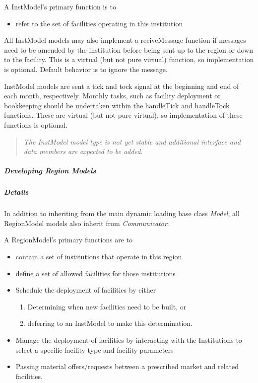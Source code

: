 \documentclass[letterpaper,10pt,english]{sphinxmanual}
\begin{document}
A InstModel's primary function is to
\begin{itemize}
\item {} 
refer to the set of facilities operating in this institution

\end{itemize}

All InstModel models may also implement a reciveMessage function if messages
need to be amended by the institution before being sent up to the region or
down to the facility. This is a virtual (but not pure virtual) function, so
implementation is optional. Default behavior is to ignore the message.

InstModel models are sent a tick and tock signal at the beginning and end of
each month, respectively. Monthly tasks, such as facility deployment or
bookkeeping should be undertaken within the handleTick and handleTock
functions. These are virtual (but not pure virtual), so implementation of these
functions is optional.
\begin{quote}

\emph{The InstModel model type is not yet stable and additional interface and
data members are expected to be added.}
\end{quote}


\subparagraph{Developing Region Models}
\label{devdoc/make-models/region:developing-region-models}\label{devdoc/make-models/region::doc}

\subparagraph{Details}
\label{devdoc/make-models/region:details}
In addition to inheriting from the main dynamic loading base class \emph{Model}, all
RegionModel models also inherit from \emph{Communicator}.

A RegionModel's primary functions are to
\begin{itemize}
\item {} 
contain a set of institutions that operate in this region

\item {} 
define a set of allowed facilities for those institutions

\item {} 
Schedule the deployment of facilities by either
\begin{enumerate}
\item {} 
Determining when new facilities need to be built, or

\item {} 
deferring to an InstModel to make this determination.

\end{enumerate}

\item {} 
Manage the deployment of facilities by interacting with the Institutions to select a specific facility type and facility parameters

\item {} 
Passing material offers/requests between a prescribed market and related facilities.

\end{itemize}
\end{document}
